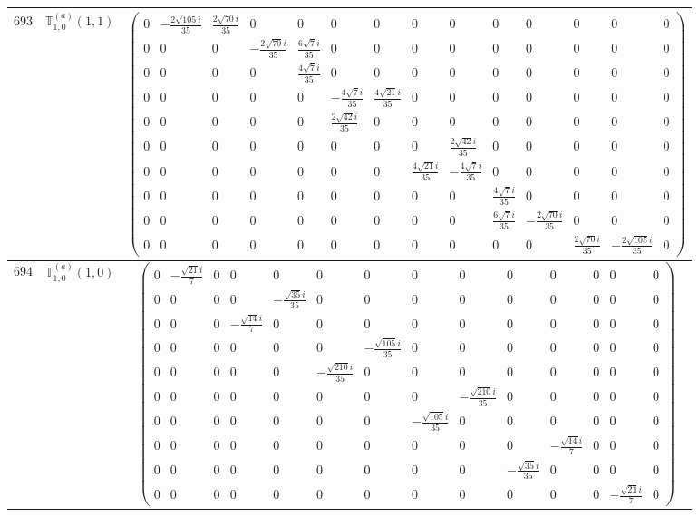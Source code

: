 \documentclass[fleqn,8pt,landscape]{jsarticle}
\begin{document}
\begin{center}
\begin{longtable}{ccc}
$ 693 $ & $ \mathbb{T}_{1,0}^{(a)}(1,1) $ & $ \begin{pmatrix} 0 & - \frac{2 \sqrt{105} i}{35} & \frac{2 \sqrt{70} i}{35} & 0 & 0 & 0 & 0 & 0 & 0 & 0 & 0 & 0 & 0 & 0 \\ 0 & 0 & 0 & - \frac{2 \sqrt{70} i}{35} & \frac{6 \sqrt{7} i}{35} & 0 & 0 & 0 & 0 & 0 & 0 & 0 & 0 & 0 \\ 0 & 0 & 0 & 0 & \frac{4 \sqrt{7} i}{35} & 0 & 0 & 0 & 0 & 0 & 0 & 0 & 0 & 0 \\ 0 & 0 & 0 & 0 & 0 & - \frac{4 \sqrt{7} i}{35} & \frac{4 \sqrt{21} i}{35} & 0 & 0 & 0 & 0 & 0 & 0 & 0 \\ 0 & 0 & 0 & 0 & 0 & \frac{2 \sqrt{42} i}{35} & 0 & 0 & 0 & 0 & 0 & 0 & 0 & 0 \\ 0 & 0 & 0 & 0 & 0 & 0 & 0 & 0 & \frac{2 \sqrt{42} i}{35} & 0 & 0 & 0 & 0 & 0 \\ 0 & 0 & 0 & 0 & 0 & 0 & 0 & \frac{4 \sqrt{21} i}{35} & - \frac{4 \sqrt{7} i}{35} & 0 & 0 & 0 & 0 & 0 \\ 0 & 0 & 0 & 0 & 0 & 0 & 0 & 0 & 0 & \frac{4 \sqrt{7} i}{35} & 0 & 0 & 0 & 0 \\ 0 & 0 & 0 & 0 & 0 & 0 & 0 & 0 & 0 & \frac{6 \sqrt{7} i}{35} & - \frac{2 \sqrt{70} i}{35} & 0 & 0 & 0 \\ 0 & 0 & 0 & 0 & 0 & 0 & 0 & 0 & 0 & 0 & 0 & \frac{2 \sqrt{70} i}{35} & - \frac{2 \sqrt{105} i}{35} & 0 \end{pmatrix} $ \\ \hline
$ 694 $ & $ \mathbb{T}_{1,0}^{(a)}(1,0) $ & $ \begin{pmatrix} 0 & - \frac{\sqrt{21} i}{7} & 0 & 0 & 0 & 0 & 0 & 0 & 0 & 0 & 0 & 0 & 0 & 0 \\ 0 & 0 & 0 & 0 & - \frac{\sqrt{35} i}{35} & 0 & 0 & 0 & 0 & 0 & 0 & 0 & 0 & 0 \\ 0 & 0 & 0 & - \frac{\sqrt{14} i}{7} & 0 & 0 & 0 & 0 & 0 & 0 & 0 & 0 & 0 & 0 \\ 0 & 0 & 0 & 0 & 0 & 0 & - \frac{\sqrt{105} i}{35} & 0 & 0 & 0 & 0 & 0 & 0 & 0 \\ 0 & 0 & 0 & 0 & 0 & - \frac{\sqrt{210} i}{35} & 0 & 0 & 0 & 0 & 0 & 0 & 0 & 0 \\ 0 & 0 & 0 & 0 & 0 & 0 & 0 & 0 & - \frac{\sqrt{210} i}{35} & 0 & 0 & 0 & 0 & 0 \\ 0 & 0 & 0 & 0 & 0 & 0 & 0 & - \frac{\sqrt{105} i}{35} & 0 & 0 & 0 & 0 & 0 & 0 \\ 0 & 0 & 0 & 0 & 0 & 0 & 0 & 0 & 0 & 0 & - \frac{\sqrt{14} i}{7} & 0 & 0 & 0 \\ 0 & 0 & 0 & 0 & 0 & 0 & 0 & 0 & 0 & - \frac{\sqrt{35} i}{35} & 0 & 0 & 0 & 0 \\ 0 & 0 & 0 & 0 & 0 & 0 & 0 & 0 & 0 & 0 & 0 & 0 & - \frac{\sqrt{21} i}{7} & 0 \end{pmatrix} $ \\ \hline

\end{longtable}
\end{center}
\end{document}
